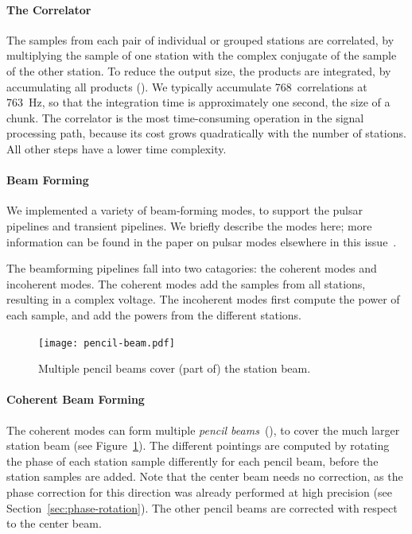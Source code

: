 \paragraph{The Correlator }
The samples from each pair of individual or grouped stations are
correlated, by multiplying the sample of one station with the complex conjugate
of the sample of the other station.
To reduce the output size, the products are integrated, by accumulating all
products ().
We typically accumulate 768~correlations at 763~Hz, so that the integration
time is approximately one second, the size of a chunk.
The correlator is the most time-consuming operation in the signal
processing path, because its cost grows quadratically with the number of
stations.
All other steps have a lower time complexity.


\paragraph{Beam Forming}
\label{sec:beam-forming}
We implemented a variety of beam-forming modes, to support the pulsar pipelines
and transient pipelines.
We briefly describe the modes here; more information can be found in the
paper on pulsar modes elsewhere in this issue~\cite{Hessels:10}.

The beamforming pipelines fall into two catagories: the coherent modes and
incoherent modes.
The coherent modes add the samples from all stations, resulting in a
complex voltage.
The incoherent modes first compute the power of each sample, and add the
powers from the different stations.


\begin{figure}
\vspace{-9mm}
\begin{center}
\texttt{[image: pencil-beam.pdf]}
\end{center}
\caption{Multiple pencil beams cover (part of) the station beam.\vspace{-5mm}}
\label{fig:pencil-beams}
\end{figure}
\paragraph{Coherent Beam Forming}
The coherent modes can form multiple \emph{pencil beams\/}~(),
to cover the much larger station beam (see Figure~\ref{fig:pencil-beams}).
The different pointings are computed by rotating the phase of each station
sample differently for each pencil beam, before the station samples are added.
Note that the center beam needs no correction, as the phase correction for
this direction was already performed at high precision (see
Section~\ref{sec:phase-rotation}).
The other pencil beams are corrected with respect to the center beam.

